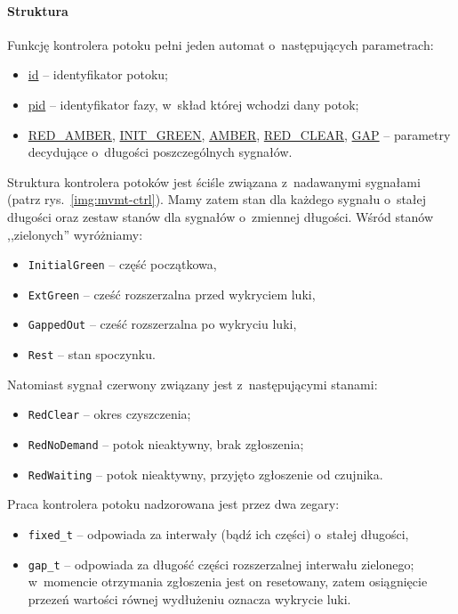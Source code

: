 \documentclass{pracamgr}
\newcommand{\imgr}[1]{rys.~\ref{#1}}
\theoremstyle{plain}
\begin{document}
\paragraph{Struktura} Funkcję kontrolera potoku pełni jeden automat
o~następujących parametrach:
\begin{itemize}
  \item \url{id} -- identyfikator potoku;
  \item \url{pid} -- identyfikator fazy, w~skład której wchodzi dany potok;
  \item \url{RED_AMBER}, \url{INIT_GREEN}, \url{AMBER},
  \url{RED_CLEAR}, \url{GAP} -- parametry decydujące o~długości
  poszczególnych sygnałów.
\end{itemize}
Struktura kontrolera potoków jest ściśle związana z~nadawanymi
sygnałami (patrz \imgr{img:mvmt-ctrl}). Mamy zatem stan dla
każdego sygnału o~stałej długości oraz zestaw stanów dla
sygnałów o~zmiennej długości. Wśród stanów ,,zielonych''
wyróżniamy:
\begin{itemize}
  \item \texttt{InitialGreen} -- część początkowa,
  \item \texttt{ExtGreen} -- cześć rozszerzalna przed wykryciem luki,
  \item \texttt{GappedOut} -- cześć rozszerzalna po wykryciu luki,
  \item \texttt{Rest} -- stan spoczynku.
\end{itemize}
Natomiast sygnał czerwony związany jest z~następującymi stanami:
\begin{itemize}
  \item \texttt{RedClear} -- okres czyszczenia;
  \item \texttt{RedNoDemand} -- potok nieaktywny, brak zgłoszenia;
  \item \texttt{RedWaiting} -- potok nieaktywny, przyjęto zgłoszenie
  od czujnika.
\end{itemize}
Praca kontrolera potoku nadzorowana jest przez dwa zegary:
\begin{itemize}
  \item \texttt{fixed\_t} -- odpowiada za interwały (bądź ich części)
  o~stałej długości,
  \item \texttt{gap\_t} -- odpowiada za długość części rozszerzalnej
  interwału zielonego; w~momencie otrzymania zgłoszenia jest on
  resetowany, zatem osiągnięcie przezeń wartości równej wydłużeniu
  oznacza wykrycie luki.
\end{itemize}
\end{document}
